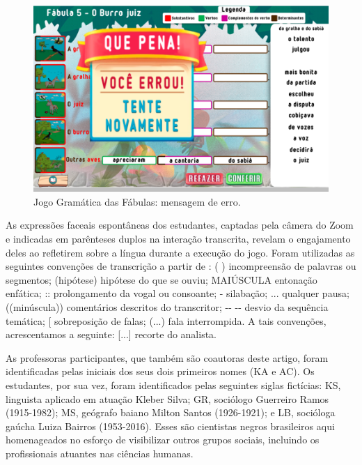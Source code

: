 \begin{figure}[h]
\centering
\begin{minipage}{.7\textwidth} 
\includegraphics[width=\textwidth]{figure05.png}
\caption{Jogo Gramática das Fábulas: mensagem de erro.}
\label{fig:fig05}
\end{minipage}
\end{figure}

As expressões faceais espontâneas dos estudantes, captadas pela câmera
do Zoom e indicadas em parênteses duplos na interação transcrita,
revelam o engajamento deles ao refletirem sobre a língua durante a
execução do jogo. Foram utilizadas as seguintes convenções de
transcrição a partir de \textcite{preti_discurso_1999}: ( ) incompreensão de palavras ou
segmentos; (hipótese) hipótese do que se ouviu; MAIÚSCULA entonação
enfática; :: prolongamento da vogal ou consoante; - silabação; ...
qualquer pausa; ((minúscula)) comentários descritos do transcritor; -\/-
-\/- desvio da sequência temática; {[} sobreposição de falas; (...) fala
interrompida. A tais convenções, acrescentamos a seguinte: {[}...{]}
recorte do analista.

As professoras participantes, que também são coautoras deste artigo,
foram identificadas pelas iniciais dos seus dois primeiros nomes (KA e
AC). Os estudantes, por sua vez, foram identificados pelas seguintes
siglas fictícias: KS, linguista aplicado em atuação Kleber Silva; GR,
sociólogo Guerreiro Ramos (1915-1982); MS, geógrafo baiano Milton Santos
(1926-1921); e LB, socióloga gaúcha Luiza Bairros (1953-2016). Esses são
cientistas negros brasileiros aqui homenageados no esforço de
visibilizar outros grupos sociais, incluindo os profissionais atuantes
nas ciências humanas.

